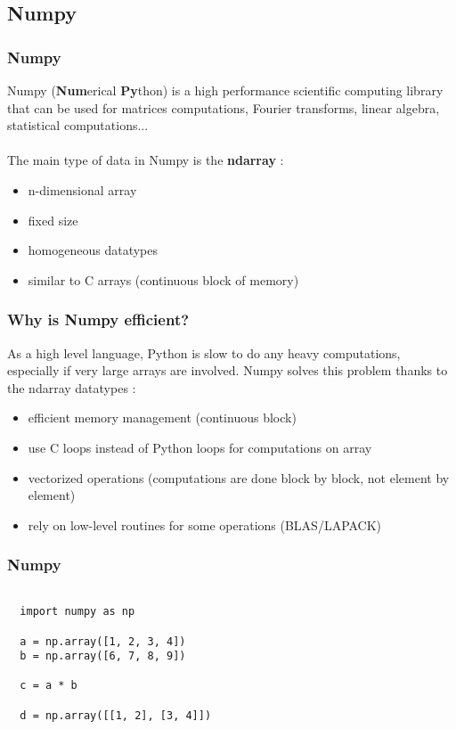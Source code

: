 \documentclass{beamer}
\begin{document}
\subsection{Numpy}
\begin{frame}
  \frametitle{Numpy}
  Numpy (\textbf{Num}erical \textbf{Py}thon) is a high performance scientific
  computing library that can be used for matrices computations, Fourier
  transforms, linear algebra, statistical computations...
  \\~\\

  The main type of data in Numpy is the \textbf{ndarray} :
  \begin{itemize}
    \item n-dimensional array
    \item fixed size
    \item homogeneous datatypes
    \item similar to C arrays (continuous block of memory)
  \end{itemize}
\end{frame}

\begin{frame}
  \frametitle{Why is Numpy efficient?}
  As a high level language, Python is slow to do any heavy computations,
  especially if very large arrays are involved. Numpy solves this problem thanks
  to the ndarray datatypes :
  \begin{itemize}
    \item efficient memory management (continuous block)
    \item use C loops instead of Python loops for computations on array
    \item vectorized operations (computations are done block by block, not
      element by element)
    \item rely on low-level routines for some operations (BLAS/LAPACK)
  \end{itemize}
\end{frame}

\begin{frame}[fragile]
  \frametitle{Numpy}
  \begin{example}
    \begin{verbatim}

  import numpy as np

  a = np.array([1, 2, 3, 4])
  b = np.array([6, 7, 8, 9])

  c = a * b

  d = np.array([[1, 2], [3, 4]])
    \end{verbatim}
  \end{example}
\end{frame}
\end{document}
